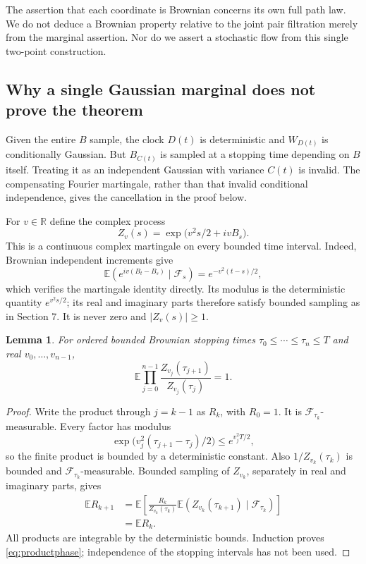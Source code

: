 \documentclass[11pt]{article}
\newtheorem{lemma}[theorem]{Lemma}
\newcommand{\E}{\mathbb E}
\newcommand{\R}{\mathbb R}
\newcommand{\F}{\mathcal F}
\begin{document}
The assertion that each coordinate is Brownian concerns its own full
path law. We do not deduce a Brownian property relative to the joint
pair filtration merely from the marginal assertion. Nor do we
assert a stochastic flow from this single two-point construction.

\subsection*{Why a single Gaussian marginal does not prove the theorem}
Given the entire $B$ sample, the clock $D(t)$ is deterministic and
$W_{D(t)}$ is conditionally Gaussian. But $B_{C(t)}$ is sampled at a
stopping time depending on $B$ itself. Treating it as an independent
Gaussian with variance $C(t)$ is invalid. The compensating Fourier
martingale, rather than that invalid conditional independence,
gives the cancellation in the proof below.

For $v\in\R$ define the complex process
\begin{equation}\label{eq:phase}
 Z_v(s)=\exp\bigl(v^2s/2+ivB_s\bigr).
\end{equation}
This is a continuous complex martingale on every bounded time
interval. Indeed, Brownian independent increments give
\[
 \E(e^{iv(B_t-B_s)}\mid\F_s)=e^{-v^2(t-s)/2},
\]
which verifies the martingale identity directly. Its modulus is the
deterministic quantity $e^{v^2s/2}$; its real and imaginary parts
therefore satisfy bounded sampling as in Section 7. It is never
zero and $|Z_v(s)|\geq1$.

\begin{lemma}\label{lem:products}
For ordered bounded Brownian stopping times
$\tau_0\leq\cdots\leq\tau_n\leq T$ and real $v_0,\ldots,v_{n-1}$,
\begin{equation}\label{eq:productphase}
 \E\prod_{j=0}^{n-1}\frac{Z_{v_j}(\tau_{j+1})}
                                  {Z_{v_j}(\tau_j)}=1.
\end{equation}
\end{lemma}
\begin{proof}
Write the product through $j=k-1$ as $R_k$, with $R_0=1$.
It is $\F_{\tau_k}$-measurable. Every factor has modulus
\[
 \exp\bigl(v_j^2(\tau_{j+1}-\tau_j)/2\bigr)
 \leq e^{v_j^2T/2},
\]
so the finite product is bounded by a deterministic constant. Also
$1/Z_{v_k}(\tau_k)$ is bounded and
$\F_{\tau_k}$-measurable. Bounded sampling of $Z_{v_k}$, separately
in real and imaginary parts, gives
\begin{align*}
 \E R_{k+1}
 &=\E\left[\frac{R_k}{Z_{v_k}(\tau_k)}
       \E(Z_{v_k}(\tau_{k+1})\mid\F_{\tau_k})\right]\\
 &=\E R_k.
\end{align*}
All products are integrable by the deterministic bounds. Induction
proves \eqref{eq:productphase}; independence of the stopping intervals
has not been used.
\end{proof}
\end{document}
